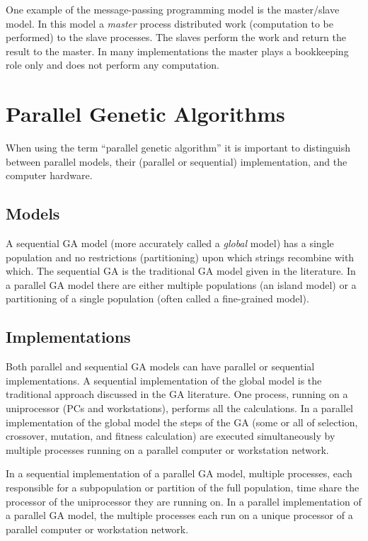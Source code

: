 \documentclass{report}
\begin{document}
One example of the message-passing programming model is the master/slave
model.  In this model a {\em master} process distributed work (computation to
be performed) to the slave processes.  The slaves perform the work and return
the result to the master.  In many implementations the master plays a
bookkeeping role only and does not perform any computation.


\section*{Parallel Genetic Algorithms}

When using the term ``parallel genetic algorithm'' it is important to
distinguish between parallel models, their (parallel or sequential)
implementation, and the computer hardware.

\subsection*{Models}

A sequential GA model (more accurately called a {\em global} model) has a
single population and no restrictions (partitioning) upon which strings
recombine with which.  The sequential GA is the traditional GA model given in
the literature.  In a parallel GA model there are either multiple
populations (an island model) or a partitioning of a single population (often
called a fine-grained model).
  
\subsection*{Implementations}

Both parallel and sequential GA models can have parallel or sequential
implementations.  A sequential implementation of the global model is the
traditional approach discussed in the GA literature.  One process, running on
a uniprocessor (PCs and workstations), performs all the calculations.  In a
parallel implementation of the global model the steps of the GA (some or all
of selection, crossover, mutation, and fitness calculation) are executed
simultaneously by multiple processes running on a parallel computer or
workstation network.

In a sequential implementation of a parallel GA model, multiple processes,
each responsible for a subpopulation or partition of the full population, time
share the processor of the  uniprocessor they are running on.  In a parallel
implementation of a parallel GA model, the multiple processes each run on a
unique processor of a parallel computer or workstation network.
\end{document}
